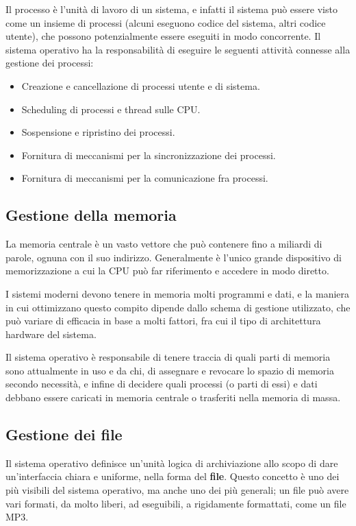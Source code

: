         Il processo è l'unità di lavoro di un sistema, e infatti il sistema può essere visto come un insieme di processi (alcuni eseguono codice del sistema, altri codice utente), che possono potenzialmente essere eseguiti in modo concorrente. Il sistema operativo ha la responsabilità di eseguire le seguenti attività connesse alla gestione dei processi:
        \begin{itemize}
            \item Creazione e cancellazione di processi utente e di sistema.
            \item Scheduling di processi e thread sulle CPU.
            \item Sospensione e ripristino dei processi.
            \item Fornitura di meccanismi per la sincronizzazione dei processi.
            \item Fornitura di meccanismi per la comunicazione fra processi.
        \end{itemize}
        
    \subsection{Gestione della memoria}
        La memoria centrale è un vasto vettore che può contenere fino a miliardi di parole, ognuna con il suo indirizzo. Generalmente è l'unico grande dispositivo di memorizzazione a cui la CPU può far riferimento e accedere in modo diretto.
        
        I sistemi moderni devono tenere in memoria molti programmi e dati, e la maniera in cui ottimizzano questo compito dipende dallo schema di gestione utilizzato, che può variare di efficacia in base a molti fattori, fra cui il tipo di architettura hardware del sistema.
        
        Il sistema operativo è responsabile di tenere traccia di quali parti di memoria sono attualmente in uso e da chi, di assegnare e revocare lo spazio di memoria secondo necessità, e infine di decidere quali processi (o parti di essi) e dati debbano essere caricati in memoria centrale o trasferiti nella memoria di massa.
        
    \subsection{Gestione dei file}
        Il sistema operativo definisce un'unità logica di archiviazione allo scopo di dare un'interfaccia chiara e uniforme, nella forma del \textbf{file}. Questo concetto è uno dei più visibili del sistema operativo, ma anche uno dei più generali; un file può avere vari formati, da molto liberi, ad eseguibili, a rigidamente formattati, come un file MP3.
        
